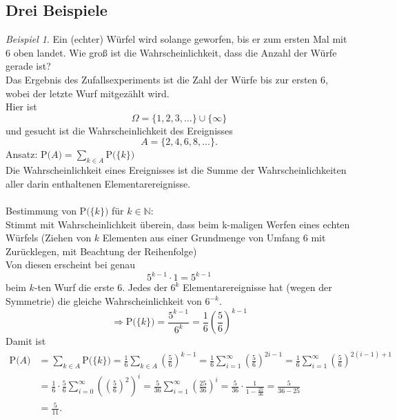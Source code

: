 \documentclass[a4paper,12pt,fleqn]{scrartcl}
\newcommand{\N}{\mathbb{N}}
\newcommand{\prob}[1]{\text{P(} #1 \text{)}}
\newcommand{\ZE}{Zufallsexperiment}
\newcommand{\impl}{\Rightarrow}
\theoremstyle{definition}
\theoremstyle{plain}
\theoremstyle{remark}
\newtheorem{beispiel}[definition]{Beispiel}
\begin{document}
\subsection{Drei Beispiele}
\begin{beispiel}
Ein (echter) Würfel wird solange geworfen, bis er zum ersten Mal mit $6$ oben landet. Wie groß ist die Wahrscheinlichkeit, dass die Anzahl der Würfe gerade ist?\\
Das Ergebnis des \ZE s ist die Zahl der Würfe bis zur ersten $6$, wobei der letzte Wurf mitgezählt wird.\\
Hier ist
\[\Omega = \{1,2,3,\ldots\} \cup \{\infty\}\]
und gesucht ist die Wahrscheinlichkeit des Ereignisses
\[A=\{2,4,6,8,\ldots\}.\]
Ansatz: $\prob{A} = \sum_{k \in A} \prob{\{k\}}$ \\
Die Wahrscheinlichkeit eines Ereignisses ist die Summe der Wahrscheinlichkeiten aller darin enthaltenen Elementarereignisse.\\
\\
Bestimmung von $\prob{\{k\}}$ für $k \in \N$: \\
Stimmt mit Wahrscheinlichkeit überein, dass beim k-maligen Werfen eines echten Würfels (Ziehen von $k$ Elementen aus einer Grundmenge von Umfang $6$ mit Zurücklegen, mit Beachtung der Reihenfolge)\\
Von diesen erscheint bei genau
\[5^{k-1} \cdot 1 = 5^{k-1}\]
beim $k$-ten Wurf die erste $6$. Jedes der $6^{k}$ Elementarereignisse hat (wegen der Symmetrie) die gleiche Wahrscheinlichkeit von $6^{-k}$.
\[\impl \prob{\{k\}}=\frac{5^{k-1}}{6^{k}}=\frac{1}{6}(\frac{5}{6})^{k-1}\]
Damit ist
\begin{align*}
\prob{A}&=\sum_{k \in A} \prob{\{k\}}=\frac{1}{6}\sum_{k \in A}(\frac{5}{6})^{k-1}=\frac{1}{6}\sum_{i=1}^{\infty}(\frac{5}{6})^{2i-1}=\frac{1}{6}\sum_{i=1}^{\infty}(\frac{5}{6})^{2(i-1)+1} \\
&=\frac{1}{6}\cdot\frac{5}{6}\sum_{i=0}^{\infty}((\frac{5}{6})^{2})^{i}=\frac{5}{36}\sum_{i=1}^{\infty}(\frac{25}{36})^{i}=\frac{5}{36}\cdot\frac{1}{1-\frac{25}{36}}=\frac{5}{36-25} \\
&=\frac{5}{11}.
\end{align*}
\end{beispiel}
\end{document}
